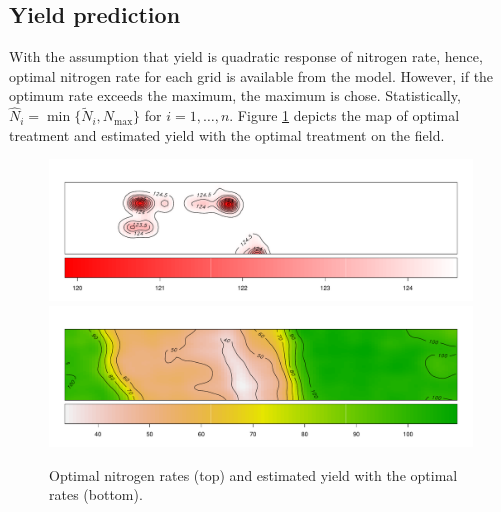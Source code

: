 \documentclass[a4paper]{article}   	%
\begin{document}
	\subsection{Yield prediction}
	
%	
		
	With the assumption that yield is quadratic response of nitrogen rate, hence, optimal nitrogen rate for each grid is available from the model. However, if the optimum rate exceeds the maximum, the maximum is chose. Statistically, $\hat{N}_i = \min\{ \tilde{N}_i, N_{\mbox{max}}\}$ for $i=1,\ldots,n$. Figure \ref{fig:optN} depicts the map of optimal treatment and estimated yield with the optimal treatment on the field. %
		
	\begin{figure}[!htp]
		\centering	
		\includegraphics[width=\textwidth]{Images/ST_opNitrogen_v2}
		\includegraphics[width=\textwidth]{Images/ST_opYield}
		\caption{Optimal nitrogen rates (top) and estimated yield with the optimal rates (bottom).}\label{fig:optN}
	\end{figure}	
	
\end{document}
